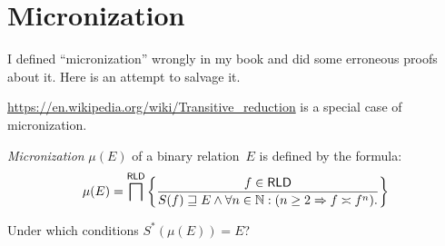 \chapter{Micronization}

I defined ``micronization'' wrongly in my book and did some erroneous
proofs about it. Here is an attempt to salvage it.

\url{https://en.wikipedia.org/wiki/Transitive_reduction} is a special
case of micronization.

\begin{defn}
\emph{Micronization} $\mu(E)$ of a binary relation~$E$ is defined by
the formula:
\[
  \mu(E) = \bigsqcap^{\mathsf{RLD}} \left\{ \frac{f\in\mathsf{RLD}}{
    S(f)\sqsupseteq E \land \forall n\in\mathbb{N}:(n \geq 2\Rightarrow f\asymp f^n).
  }\right\}
\]
\end{defn}

\begin{question}
Under which conditions $S^\ast(\mu(E)) = E$?
\end{question}
